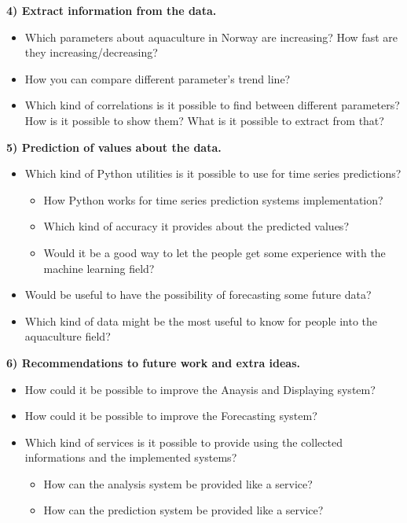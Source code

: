 \newpage

\textbf{4) Extract information from the data.}
\vspace{-5mm}
\begin{itemize}
 \setlength{\itemsep}{-5pt}
  \item Which parameters about aquaculture in Norway are increasing? How fast are they increasing/decreasing? 
  \item How you can compare different parameter's trend line?
  \item Which kind of correlations is it possible to find between different parameters? How is it possible to show them? What is it possible to extract from that?
 \end{itemize}
 
\textbf{5) Prediction of values about the data.}
\vspace{-5mm}
\begin{itemize}
 \setlength{\itemsep}{-5pt} 
  \item Which kind of Python utilities is it possible to use for time series predictions?
  		\vspace{-3mm}
		\begin{itemize}
 		\setlength{\itemsep}{-5pt}	
		  \item How Python works for time series prediction systems implementation?
		  \item Which kind of accuracy it provides about the predicted values?
		  \item Would it be a good way to let the people get some experience with the machine learning field? 
		\end{itemize}
  \item Would be useful to have the possibility of forecasting some future data? 
  \item Which kind of data might be the most useful to know for people into the aquaculture field?
	
 \end{itemize}

\textbf{6) Recommendations to future work and extra ideas.}
\vspace{-5mm}
\begin{itemize}
\setlength{\itemsep}{-5pt}
	\item How could it be possible to improve the Anaysis and Displaying system?
	\item How could it be possible to improve the Forecasting system?
	\item Which kind of services is it possible to provide using the collected informations and the implemented systems?
  		\vspace{-3mm}
		\begin{itemize}
 		\setlength{\itemsep}{-5pt}	
		  	\item How can the analysis system be provided like a service?
		  	\item How can the prediction system be provided like a service?
		\end{itemize}
 \end{itemize}

